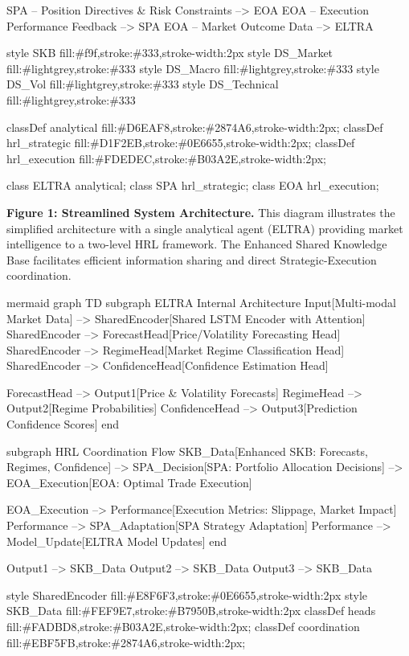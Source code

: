 \documentclass[11pt,a4paper]{article}
\begin{document}
    SPA -- Position Directives \& Risk Constraints --> EOA
    EOA -- Execution Performance Feedback --> SPA
    EOA -- Market Outcome Data --> ELTRA

    style SKB fill:\#f9f,stroke:\#333,stroke-width:2px
    style DS\_Market fill:\#lightgrey,stroke:\#333
    style DS\_Macro fill:\#lightgrey,stroke:\#333
    style DS\_Vol fill:\#lightgrey,stroke:\#333
    style DS\_Technical fill:\#lightgrey,stroke:\#333

    classDef analytical fill:\#D6EAF8,stroke:\#2874A6,stroke-width:2px;
    classDef hrl\_strategic fill:\#D1F2EB,stroke:\#0E6655,stroke-width:2px;
    classDef hrl\_execution fill:\#FDEDEC,stroke:\#B03A2E,stroke-width:2px;

    class ELTRA analytical;
    class SPA hrl\_strategic;
    class EOA hrl\_execution;

\textbf{Figure 1: Streamlined System Architecture.} This diagram illustrates the simplified architecture with a single analytical agent (ELTRA) providing market intelligence to a two-level HRL framework. The Enhanced Shared Knowledge Base facilitates efficient information sharing and direct Strategic-Execution coordination.

mermaid
graph TD
    subgraph ELTRA Internal Architecture
        Input[Multi-modal Market Data] --> SharedEncoder[Shared LSTM Encoder with Attention]
        SharedEncoder --> ForecastHead[Price/Volatility Forecasting Head]
        SharedEncoder --> RegimeHead[Market Regime Classification Head]
        SharedEncoder --> ConfidenceHead[Confidence Estimation Head]
        
        ForecastHead --> Output1[Price \& Volatility Forecasts]
        RegimeHead --> Output2[Regime Probabilities]
        ConfidenceHead --> Output3[Prediction Confidence Scores]
    end

    subgraph HRL Coordination Flow
        SKB\_Data[Enhanced SKB: Forecasts, Regimes, Confidence] 
        --> SPA\_Decision[SPA: Portfolio Allocation Decisions]
        --> EOA\_Execution[EOA: Optimal Trade Execution]
        
        EOA\_Execution --> Performance[Execution Metrics: Slippage, Market Impact]
        Performance --> SPA\_Adaptation[SPA Strategy Adaptation]
        Performance --> Model\_Update[ELTRA Model Updates]
    end

    Output1 --> SKB\_Data
    Output2 --> SKB\_Data
    Output3 --> SKB\_Data

    style SharedEncoder fill:\#E8F6F3,stroke:\#0E6655,stroke-width:2px
    style SKB\_Data fill:\#FEF9E7,stroke:\#B7950B,stroke-width:2px
    classDef heads fill:\#FADBD8,stroke:\#B03A2E,stroke-width:2px;
    classDef coordination fill:\#EBF5FB,stroke:\#2874A6,stroke-width:2px;
    
\end{document}
